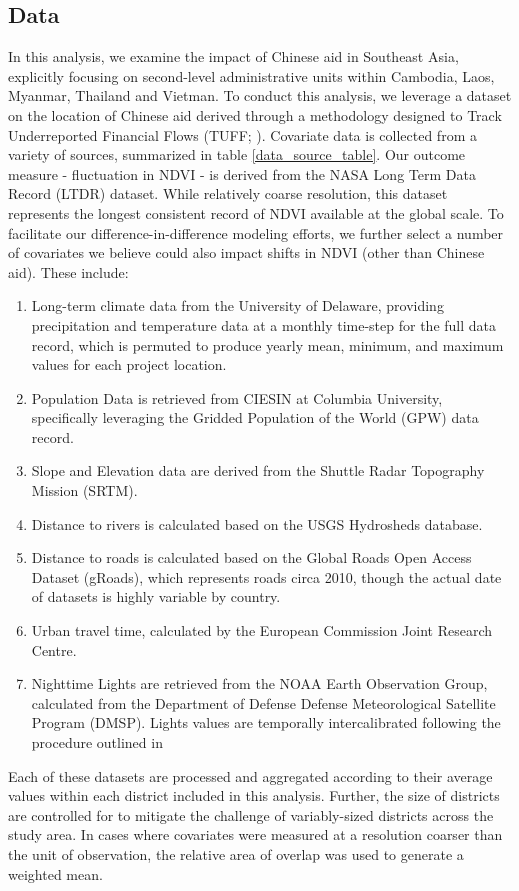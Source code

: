 \subsection{Data}

In this analysis, we examine the impact of Chinese aid in Southeast Asia, explicitly focusing on second-level administrative units within Cambodia, Laos, Myanmar, Thailand and Vietman.
To conduct this analysis, we leverage a dataset on the location of Chinese aid derived through a methodology designed to Track Underreported Financial Flows (TUFF; \cite{strange_tracking_2015}).
Covariate data is collected from a variety of sources, summarized in table \ref{data_source_table}.
Our outcome measure - fluctuation in NDVI - is derived from the NASA Long Term Data Record (LTDR) dataset.
While relatively coarse resolution, this dataset represents the longest consistent record of NDVI available at the global scale.
To facilitate our difference-in-difference modeling efforts, we further select a number of covariates we believe could also impact shifts in NDVI (other than Chinese aid).
These include:
\begin{enumerate}
\item{Long-term climate data from the University of Delaware, providing precipitation and temperature data at a monthly time-step for the full data record, which is permuted to produce yearly mean, minimum, and maximum values for each project location. \cite{willmott_terrestrial_2001}}
\item{Population Data is retrieved from CIESIN at Columbia University, specifically leveraging the Gridded Population of the World (GPW) data record. \cite{ciesin_gridded_????}}
\item{Slope and Elevation data are derived from the Shuttle Radar Topography Mission (SRTM).\cite{farr_shuttle_2007}}
\item{Distance to rivers is calculated based on the USGS Hydrosheds database.}
\item{Distance to roads is calculated based on the Global Roads Open Access Dataset (gRoads), which represents roads circa 2010, though the actual date of datasets is highly variable by country.}
\item{Urban travel time, calculated by the European Commission Joint Research Centre.}
\item{Nighttime Lights are retrieved from the NOAA Earth Observation Group, calculated from the Department of Defense Defense Meteorological Satellite Program (DMSP).  Lights values are temporally intercalibrated following the procedure outlined in \cite{weng_global_2014}}
\end{enumerate}
Each of these datasets are processed and aggregated according to their average values within each district included in this analysis.  
Further, the size of districts are controlled for to mitigate the challenge of variably-sized districts across the study area.
In cases where covariates were measured at a resolution coarser than the unit of observation, the relative area of overlap was used to generate a weighted mean.









